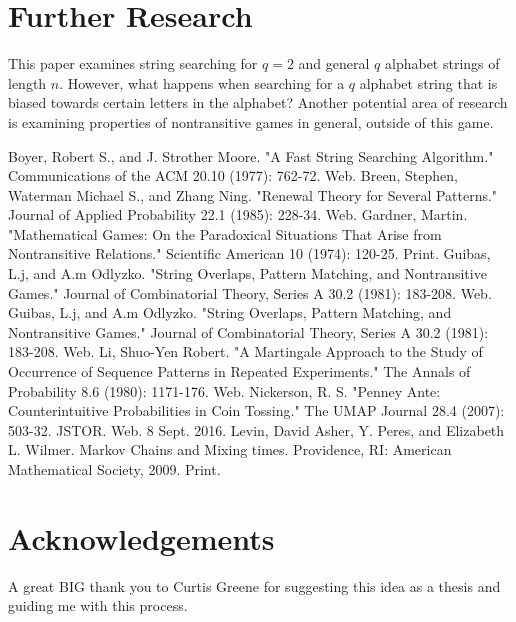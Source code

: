 \documentclass[12pt,haverford,landscape]{haverposter}
\begin{document}
\begin{multicols}{4}
\section{\LARGE Further Research}

This paper examines string searching for $q=2$ and general $q$ alphabet strings of length $n$.
 However, what happens when searching for a $q$ alphabet string that is biased towards certain
  letters in the alphabet? Another potential area of research is examining properties of
  nontransitive games in general, outside of this game.


\nocite{*} %
\small \begin{thebibliography}{1}
		Boyer, Robert S., and J. Strother Moore. "A Fast String Searching Algorithm." Communications of the ACM 20.10 (1977): 762-72. Web.
		Breen, Stephen, Waterman Michael S., and Zhang Ning. "Renewal Theory for Several Patterns." Journal of Applied Probability 22.1 (1985): 228-34. Web.
		Gardner, Martin. "Mathematical Games: On the Paradoxical Situations That Arise from Nontransitive Relations." Scientific American 10 (1974): 120-25. Print.
		Guibas, L.j, and A.m Odlyzko. "String Overlaps, Pattern Matching, and Nontransitive Games." Journal of Combinatorial Theory, Series A 30.2 (1981): 183-208. Web.  Guibas, L.j, and A.m Odlyzko. "String Overlaps, Pattern Matching, and Nontransitive Games." Journal of Combinatorial Theory, Series A 30.2 (1981): 183-208. Web.
		Li, Shuo-Yen Robert. "A Martingale Approach to the Study of Occurrence of Sequence Patterns in Repeated Experiments." The Annals of Probability 8.6 (1980): 1171-176. Web.
		Nickerson, R. S. "Penney Ante: Counterintuitive Probabilities in Coin Tossing." The UMAP Journal 28.4 (2007): 503-32. JSTOR. Web. 8 Sept. 2016.
		Levin, David Asher, Y. Peres, and Elizabeth L. Wilmer. Markov Chains and Mixing times. Providence, RI: American Mathematical Society, 2009. Print.
\end{thebibliography}
			

\section*{\LARGE Acknowledgements}

\large A great BIG thank you to Curtis Greene for suggesting this idea as a thesis and
guiding me with this process.

\end{multicols}
\end{document}
